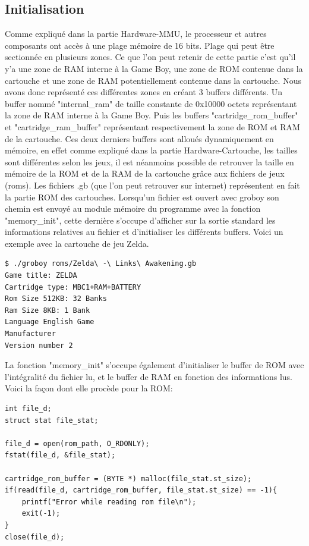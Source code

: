 \documentclass[french]{report}
\begin{document}
\subsection{Initialisation} 
Comme expliqué dans la partie Hardware-MMU, le processeur et autres composants ont accès à une plage mémoire de 16 bits. Plage qui peut être sectionnée en plusieurs zones. Ce que l'on peut retenir de cette partie c'est qu'il y'a une zone de RAM interne à la Game Boy, une zone de ROM contenue dans la cartouche et une zone de RAM potentiellement contenue dans la cartouche. Nous avons donc représenté ces différentes zones en créant 3 buffers différents. Un buffer nommé "internal\_ram" de taille constante de 0x10000 octets représentant la zone de RAM interne à la Game Boy. Puis les buffers "cartridge\_rom\_buffer" et "cartridge\_ram\_buffer" représentant respectivement la zone de ROM et RAM de la cartouche.
Ces deux derniers buffers sont alloués dynamiquement en mémoire, en effet comme expliqué dans la partie Hardware-Cartouche, les tailles sont différentes selon les jeux, il est néanmoins possible de retrouver la taille en mémoire de la ROM et de la RAM de la cartouche grâce aux fichiers de jeux (roms).
Les fichiers .gb (que l'on peut retrouver sur internet) représentent en fait la partie ROM des cartouches.
Lorsqu'un fichier est ouvert avec groboy son chemin est envoyé au module mémoire du programme avec la fonction "memory\_init", cette dernière s'occupe d'afficher sur la sortie standard les informations relatives au fichier et d'initialiser les différents buffers. Voici un exemple avec la cartouche de jeu Zelda.
\begin{lstlisting}
$ ./groboy roms/Zelda\ -\ Links\ Awakening.gb
Game title: ZELDA
Cartridge type: MBC1+RAM+BATTERY
Rom Size 512KB: 32 Banks
Ram Size 8KB: 1 Bank
Language English Game
Manufacturer
Version number 2
\end{lstlisting}
La fonction "memory\_init" s'occupe également d'initialiser le buffer de ROM avec l'intégralité du fichier lu, et le buffer de RAM en fonction des informations lus.
Voici la façon dont elle procède pour la ROM:
\begin{lstlisting}
int file_d;
struct stat file_stat;

file_d = open(rom_path, O_RDONLY);
fstat(file_d, &file_stat);

cartridge_rom_buffer = (BYTE *) malloc(file_stat.st_size);
if(read(file_d, cartridge_rom_buffer, file_stat.st_size) == -1){
	printf("Error while reading rom file\n");
	exit(-1);
}    
close(file_d);
\end{lstlisting}
\end{document}
